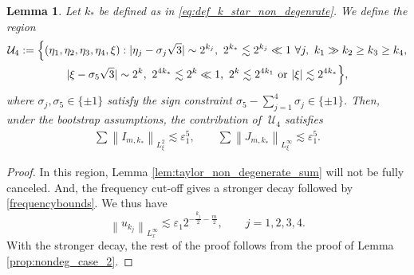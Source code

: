 \documentclass[reqno,english,11pt]{amsart}
\newcommand{\eps}{\varepsilon}
\newcommand{\snorm}[1]{\left\|#1\right\|}
\newtheorem{lemma}[theorem]{Lemma}
\theoremstyle{definition}
\numberwithin{equation}{section}
\begin{document}
\begin{lemma}\label{prop:non_deg_case_4}
Let $k_*$ be defined as in \eqref{eq:def_k_star_non_degenrate}.
We define the region
\begin{multline*}
\mathcal{U}_{4}:=\Bigl\{(\eta_1,\eta_2,\eta_3,\eta_4,\xi):|\eta_j-\sigma_j\sqrt{3}|\sim 2^{k_j},\ 2^{k_*}\lesssim 2^{k_j}\ll 1 \ \forall j,\ k_1\gg k_2\ge k_3\ge k_4,\\
|\xi-\sigma_5\sqrt{3}|\sim 2^{k},\
2^{4k_*}\lesssim 2^{k}\ll 1,\
2^{k}\lesssim 2^{4k_1} \text{ or }|\xi|\lesssim 2^{4k_*}
\Bigr\},
\end{multline*}
where $\sigma_j,\sigma_5\in\{\pm1\}$ satisfy the sign constraint
$\sigma_5-\sum_{j=1}^4\sigma_j\in\{\pm1\}$.
Then, under the bootstrap assumptions, the contribution of $\;\mathcal{U}_4$ satisfies
    \begin{align*}
\sum\snorm{I_{m,k_*}}_{L^2_\xi}\lesssim \eps_1^5,\qquad\sum\snorm{J_{m,k_*}}_{L^\infty_\xi}\lesssim \eps_1^5.
    \end{align*}

    
\end{lemma}
\begin{proof}
In this region, Lemma \ref{lem:taylor_non_degenerate_sum} will not be fully canceled. And, the frequency cut-off gives a stronger decay followed by \eqref{frequencybounds}. We thus have 
$$\snorm{u_{k_j}}_{L^\infty_x}\lesssim \eps_1 2^{-\frac{k_j}{2}-\frac{m}{2}},\qquad j=1,2,3,4.$$
With the stronger decay, the rest of the proof follows from the proof of Lemma \ref{prop:nondeg_case_2}.
\end{proof}
\end{document}
